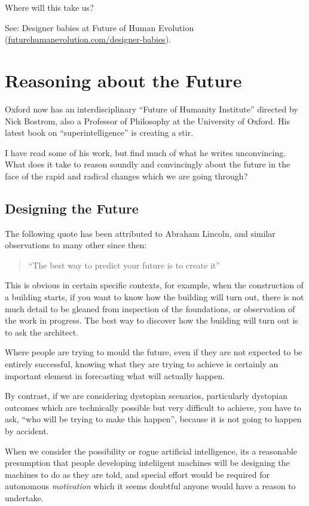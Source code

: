 \documentclass[12pt,titlepage]{article}
\begin{document}
{Where will this take us?

See: Designer babies at Future of Human Evolution (\href{http://futurehumanevolution.com/designer-babies}{futurehumanevolution.com/designer-babies}).

\section{Reasoning about the Future}

Oxford now has an interdisciplinary ``Future of Humanity Institute'' directed by Nick Bostrom, also a Professor of Philosophy at the University of Oxford.
His latest book on ``superintelligence'' is creating a stir.

I have read some of his work, but find much of what he writes unconvincing.
What does it take to reason soundly and convincingly about the future in the
face of the rapid and radical changes which we are going through?

\subsection{Designing the Future}

The following quote has been attributed to Abraham Lincoln, and similar
observations to many other since then:

\begin{quote}
“The best way to predict your future is to create it”
\end{quote}

This is obvious in certain specific contexts, for example, when the construction
of a building starts, if you want to know how the building will turn out, there is
not much detail to be gleaned from inspection of the foundations, or observation of the
work in progress.
The best way to discover how the building will turn out is to ask the architect.

Where people are trying to mould the future, even if they are not expected to be
entirely successful, knowing what they are trying to achieve is certainly an important
element in forecasting what will actually happen.

By contrast, if we are considering dystopian scenarios, particularly dystopian
outcomes which are technically possible but very difficult to achieve, you have to
ask, ``who will be trying to make this happen'', because it is not going to happen
by accident.

When we consider the possibility or rogue artificial intelligence, its a reasonable
presumption that people developing inteliigent machines will be designing the machines
to do as they are told, and special effort would be required for autonomous \emph{motivation}
which it seems doubtful anyone would have a reason to undertake.

}
\end{document}
